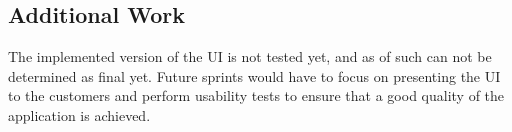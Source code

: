 \subsection{Additional Work}
The implemented version of the UI is not tested yet, and as of such can not be determined as final yet.
Future sprints would have to focus on presenting the UI to the customers and perform usability tests to ensure that a good quality of the application is achieved.